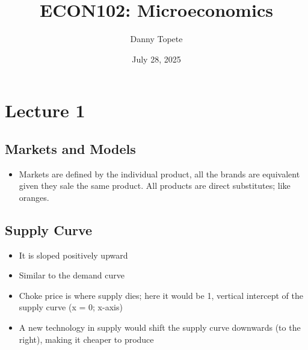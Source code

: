 \documentclass{article}
\title{ECON102: Microeconomics}
\author{Danny Topete}
\date{July 28, 2025}
\begin{document}
\maketitle

\section{Lecture 1}

\subsection{Markets and Models}
\begin{itemize}
  \item Markets are defined by the individual product,
    all the brands are equivalent given they sale the same product.
    All products are direct substitutes; like oranges.
\end{itemize}


\subsection{Supply Curve}
\begin{itemize}
  \item It is sloped positively upward
  \item Similar to the demand curve
  \item Choke price is where supply dies; here it would be 1,
    vertical intercept of the supply curve (x = 0; x-axis)
  \item A new technology in supply would shift the supply curve
    downwards (to the right), making it cheaper to produce
\end{itemize}
\end{document}
